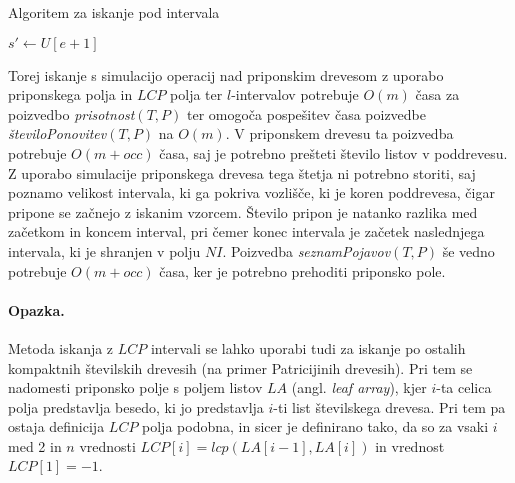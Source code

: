\begin{algorithm}[htb]

    \caption{Algoritem za iskanje pod intervala }\label{alg:interval}
    {
                    {$s'\leftarrow U[e+1]$}

            {\Vrni{$[s,s'-1]$}}


                {\Vrni{$[s',e]$}}
        
        {\Vrni{$[-1,-1]$}}    
    }
\end{algorithm}


Torej iskanje s simulacijo operacij nad priponskim drevesom z uporabo priponskega polja in $LCP$ polja ter $l$-intervalov potrebuje $O(m)$ časa za poizvedbo \textit{prisotnost}$(T,P)$ ter omogoča pospešitev časa poizvedbe \textit{številoPonovitev}$(T,P)$ na $O(m)$. V priponskem drevesu ta poizvedba potrebuje $O(m+occ)$ časa, saj je potrebno prešteti število listov v poddrevesu. Z uporabo simulacije priponskega drevesa tega štetja ni potrebno storiti, saj poznamo velikost intervala, ki ga pokriva vozlišče, ki je koren poddrevesa, čigar pripone se začnejo z iskanim vzorcem. Število pripon je natanko razlika med začetkom in koncem interval, pri čemer konec intervala je začetek naslednjega intervala, ki je shranjen v polju $NI$. Poizvedba \textit{seznamPojavov}$(T,P)$ še vedno potrebuje $O(m+occ)$ časa, ker je potrebno prehoditi priponsko pole.

\paragraph{Opazka.}
Metoda iskanja z $LCP$ intervali se lahko uporabi tudi za iskanje po ostalih kompaktnih številskih drevesih (na primer Patricijinih drevesih). Pri tem se nadomesti priponsko polje s poljem listov $LA$ (angl. \textit{leaf array}), kjer $i$-ta celica polja predstavlja besedo, ki jo predstavlja $i$-ti list številskega drevesa. Pri tem pa ostaja definicija $LCP$ polja podobna, in sicer je definirano tako, da so za vsaki $i$ med 2 in $n$ vrednosti $LCP[i]=lcp(LA[i-1],LA[i])$ in vrednost $LCP[1]=-1$.
